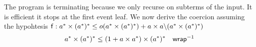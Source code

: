 \begin{example}
The program is terminating because we only recurse on subterms of the input. It is efficient it stops at the first event leaf. We now derive the coercion assuming the hypohtesis $\mathsf{f} : a^* \times ({a^*})^* \leq o(a^* \times ({a^*})^*) + a \times a \backslash (a^* \times ({a^*})^*)$
\begin{align}
a^* \times \dstar{a} &\leq (1 + a \times a^*) \times \dstar{a}  &&\dslcominv{wrap}  \\

\end{align}
\end{example}

